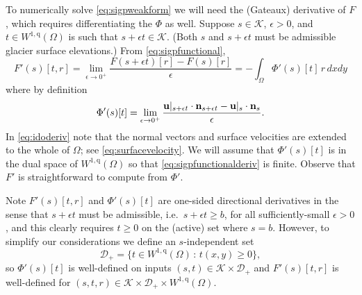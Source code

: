 \documentclass[letterpaper,final,12pt,reqno]{amsart}
\theoremstyle{claim}
\newcommand{\eps}{\epsilon}
\newcommand{\bn}{\mathbf{n}}
\newcommand{\bu}{\mathbf{u}}
\newcommand{\qq}{{\text{q}}}
\numberwithin{equation}{section}
\numberwithin{figure}{section}
\numberwithin{table}{section}
\numberwithin{theorem}{section}
\begin{document}
To numerically solve \eqref{eq:sigpweakform} we will need the (Gateaux) derivative of $F$, which requires differentiating the $\Phi$ as well.  Suppose $s\in \mathcal{K}$, $\eps>0$, and $t \in W^{1,\qq}(\Omega)$ is such that $s+\eps t \in \mathcal{K}$.  (Both $s$ and $s+\eps t$ must be admissible glacier surface elevations.)  From \eqref{eq:sigpfunctional},
\begin{equation}
F'(s)[t,r] = \lim_{\eps\to 0^+} \frac{F(s+\eps t)[r] - F(s)[r]}{\eps} = - \int_\Omega \Phi'(s)[t]\, r \,dx dy \label{eq:sigpfunctionalderiv}
\end{equation}
where by definition
\begin{equation}
\Phi'(s)[t] = \lim_{\eps\to 0^+} \frac{\bu|_{s+\eps t} \cdot \bn_{s+\eps t} - \bus \cdot \bn_s}{\eps}. \label{eq:idoderiv}
\end{equation}
In \eqref{eq:idoderiv} note that the normal vectors and surface velocities are extended to the whole of $\Omega$; see \eqref{eq:surfacevelocity}.  We will assume that $\Phi'(s)[t]$ is in the dual space of $W^{1,\qq}(\Omega)$ so that \eqref{eq:sigpfunctionalderiv} is finite.  Observe that $F'$ is straightforward to compute from $\Phi'$.

Note $F'(s)[t,r]$ and $\Phi'(s)[t]$ are one-sided directional derivatives in the sense that $s+\eps t$ must be admissible, i.e.~$s+\eps t\ge b$, for all sufficiently-small $\eps>0$, and this clearly requires $t\ge 0$ on the (active) set where $s=b$.  However, to simplify our considerations we define an $s$-independent set
\begin{equation}
\mathcal{D}_+ = \{t \in W^{1,\qq}(\Omega) \,:\, t(x,y) \ge 0\}, \label{eq:infdefectset}
\end{equation}
so $\Phi'(s)[t]$ is well-defined on inputs $(s,t) \in \mathcal{K} \times \mathcal{D}_+$ and $F'(s)[t,r]$ is well-defined for $(s,t,r) \in \mathcal{K} \times \mathcal{D}_+ \times W^{1,\qq}(\Omega)$.
\end{document}
